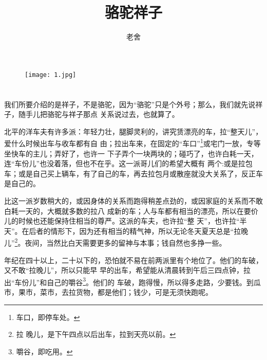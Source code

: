 \documentclass[11pt,a4paper,onecolumn]{article}
\title{骆驼祥子}
\author{老舍}
\date{}
\begin{document}
\pagestyle{empty}


\begin{figure}[!htbp]
\begin{center}
\texttt{[image: 1.jpg]}
\end{center}
\end{figure}

\pagebreak
\setcounter{page}{1}

\pagestyle{fancy}

\section{}

我们所要介绍的是祥子，不是骆驼，因为``骆驼''只是个外号；那么，我们就先说祥子，随手儿把骆驼与祥子那点
关系说过去，也就算了。

北平的洋车夫有许多派：年轻力壮，腿脚灵利的，讲究赁漂亮的车，拉``整天儿''，爱什么时候出车与收车都有自
由；拉出车来，在固定的``车口''\footnote{车口，即停车处。}或宅门一放，专等坐快车的主儿；弄好了，也许一
下子弄个一块两块的；碰巧了，也许白耗一天，连``车份儿''也没着落，但也不在乎。这一派哥儿们的希望大概有
两个:或是拉包车；或是自己买上辆车，有了自己的车，再去拉包月或散座就没大关系了，反正车是自己的。

比这一派岁数稍大的，或因身体的关系而跑得稍差点劲的，或因家庭的关系而不敢白耗一天的，大概就多数的拉八
成新的车；人与车都有相当的漂亮，所以在要价儿的时候也还能保持住相当的尊严。这派的车夫，也许拉``整
天''，也许拉``半天''。在后者的情形下，因为还有相当的精气神，所以无论冬天夏天总是``拉晚儿''\footnote{拉
  晚儿，是下午四点以后出车，拉到天亮以前。}。夜间，当然比白天需要更多的留神与本事；钱自然也多挣一些。

年纪在四十以上，二十以下的，恐怕就不易在前两派里有个地位了。他们的车破，又不敢``拉晚儿''，所以只能早
早的出车，希望能从清晨转到午后三四点钟，拉出``车份儿''和自己的嚼谷\footnote{嚼谷，即吃用。}。他们的
车破，跑得慢，所以得多走路，少要钱。到瓜市，果市，菜市，去拉货物，都是他们；钱少，可是无须快跑呢。
\end{document}
